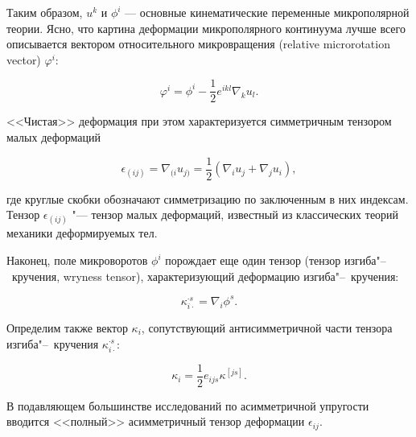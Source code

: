 Таким образом, \(u^k\) и \(\phi^i\) \cdash--- основные кинематические переменные микрополярной теории. Ясно, что картина деформации микрополярного континуума лучше всего описывается вектором относительного микровращения (relative microrotation vector) \(\varphi^i\):

\begin{equation}

\varphi^i=\phi^i-\dfrac{1}{2}e^{ikl}\nabla_ku_l.

\label{eq:relative-microrotation-vector}

\end{equation}



<<Чистая>> деформация при этом характеризуется симметричным тензором малых деформаций

\begin{equation}

\epsilon_{(ij)}=\nabla_{(i}u_{j)}=\dfrac{1}{2}(\nabla_iu_j+\nabla_ju_i),

\label{eq:symm-strain-tensor}

\end{equation}

где круглые скобки обозначают симметризацию по заключенным в них индексам. Тензор \(\epsilon_{(ij)}\) "--- тензор малых деформаций, известный из классических теорий механики деформируемых тел.



Наконец, поле микроворотов \(\phi^i\) порождает еще один тензор (тензор изгиба"--~кручения, wryness tensor), характеризующий деформацию изгиба"--~кручения:

\begin{equation}

\kappa_{i\cdot}^{\cdot s}=\nabla_i\phi^s.

\label{eq:wryness-tensor}

\end{equation}

Определим также вектор \(\kappa_i\), сопутствующий антисимметричной части тензора изгиба"--~кручения \(\kappa_{i\cdot}^{\cdot s}\):

\begin{equation}

\kappa_i=\dfrac{1}{2}e_{ijs}\kappa^{[js]}.

\end{equation}



В подавляющем большинстве исследований по асимметричной упругости вводится <<полный>> асимметричный тензор деформации \(\epsilon_{ij}\). 

